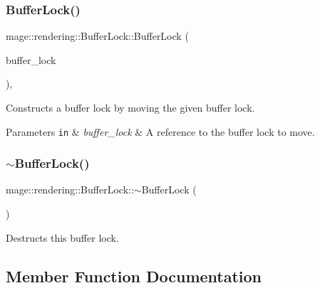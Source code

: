 \subsubsection{\texorpdfstring{Buffer\+Lock()}{BufferLock()}\hspace{0.1cm}{\footnotesize\ttfamily [3/3]}}
{\footnotesize\ttfamily mage\+::rendering\+::\+Buffer\+Lock\+::\+Buffer\+Lock (\begin{DoxyParamCaption}\item[{\hyperlink{classmage_1_1rendering_1_1_buffer_lock}{Buffer\+Lock} \&\&}]{buffer\+\_\+lock }\end{DoxyParamCaption})\hspace{0.3cm}{\ttfamily [default]}, {\ttfamily [noexcept]}}

Constructs a buffer lock by moving the given buffer lock.


\begin{DoxyParams}[1]{Parameters}
\mbox{\tt in}  & {\em buffer\+\_\+lock} & A reference to the buffer lock to move. \\
\hline
\end{DoxyParams}
\hypertarget{classmage_1_1rendering_1_1_buffer_lock_ae7ce340c09dc0698aedf33aeb66b14c6}{}\label{classmage_1_1rendering_1_1_buffer_lock_ae7ce340c09dc0698aedf33aeb66b14c6} 
\subsubsection{\texorpdfstring{$\sim$\+Buffer\+Lock()}{~BufferLock()}}
{\footnotesize\ttfamily mage\+::rendering\+::\+Buffer\+Lock\+::$\sim$\+Buffer\+Lock (\begin{DoxyParamCaption}{ }\end{DoxyParamCaption})}

Destructs this buffer lock. 

\subsection{Member Function Documentation}
\hypertarget{classmage_1_1rendering_1_1_buffer_lock_a88693ae3717c7098d5cc2313cd16b8a6}{}\label{classmage_1_1rendering_1_1_buffer_lock_a88693ae3717c7098d5cc2313cd16b8a6} 
